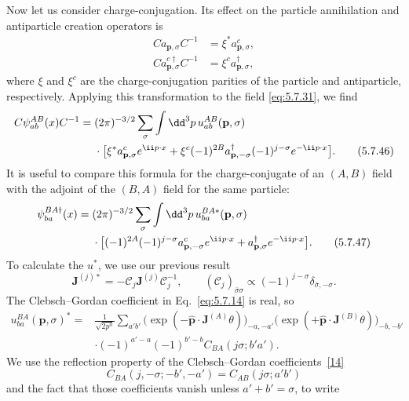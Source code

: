 Now let us consider charge-conjugation. Its effect on the particle annihilation
and antiparticle creation operators is
\begin{align}
C a_{\mathbf p,\sigma}C^{-1}&=\xi^*a^c_{\mathbf p,\sigma},
\tag{5.7.44}\label{eq:5.7.44}\\
C a^{c\dagger}_{\mathbf p,\sigma}C^{-1}&=\xi^c a^\dagger_{\mathbf p,\sigma},
\tag{5.7.45}\label{eq:5.7.45}
\end{align}
where $\xi$ and $\xi^c$ are the charge-conjugation parities of the particle
and antiparticle, respectively. Applying this transformation to the field
\eqref{eq:5.7.31}, we find
\begin{align}
C\psi^{AB}_{ab}(x)C^{-1}={}&(2\pi)^{-3/2}\sum_\sigma\int \dd^3p\,
u^{AB}_{ab}(\mathbf p,\sigma)
\notag\\
&\cdot\bigl[\xi^*a^c_{\mathbf p,\sigma}e^{\ii p\cdot x}
+\xi^c(-1)^{2B}a^\dagger_{\mathbf p,-\sigma}(-1)^{j-\sigma}
e^{-\ii p\cdot x}\bigr].
\tag{5.7.46}\label{eq:5.7.46}
\end{align}
It is useful to compare this formula for the charge-conjugate of an $(A,B)$
field with the adjoint of the $(B,A)$ field for the same particle:
\begin{align}
\psi^{BA\dagger}_{ba}(x)={}&(2\pi)^{-3/2}\sum_\sigma\int \dd^3p\,
u^{BA*}_{ba}(\mathbf p,\sigma)
\notag\\
&\cdot\bigl[(-1)^{2A}(-1)^{j-\sigma}a^c_{\mathbf p,-\sigma}e^{\ii p\cdot x}
+a^\dagger_{\mathbf p,\sigma}e^{-\ii p\cdot x}\bigr].
\tag{5.7.47}\label{eq:5.7.47}
\end{align}
To calculate the $u^*$, we use our previous result
\[
\mathbf J^{(j)*}=-\mathcal C_j\mathbf J^{(j)}\mathcal C_j^{-1},
\qquad (\mathcal C_j)_{\bar\sigma\sigma}\propto
(-1)^{j-\sigma}\delta_{\bar\sigma,-\sigma}.
\]
The Clebsch--Gordan coefficient in Eq.~\eqref{eq:5.7.14} is real, so
\begin{align*}
u^{BA}_{ba}(\mathbf p,\sigma)^*={}&\frac{1}{\sqrt{2p^0}}
\sum_{a'b'}
\bigl(\exp(-\widehat{\mathbf p}\cdot\mathbf J^{(A)}\theta)\bigr)_{-a,-a'}
\bigl(\exp(+\widehat{\mathbf p}\cdot\mathbf J^{(B)}\theta)\bigr)_{-b,-b'}
\\
&\cdot(-1)^{a'-a}(-1)^{b'-b}C_{BA}(j\sigma;b'a').
\end{align*}
We use the reflection property of the Clebsch--Gordan coefficients~\hyperref[ref:5.14]{[14]}
\begin{equation}
C_{BA}(j,-\sigma;-b',-a')=C_{AB}(j\sigma;a'b')
\tag{5.7.48}\label{eq:5.7.48}
\end{equation}
and the fact that those coefficients vanish unless $a'+b'=\sigma$, to write
